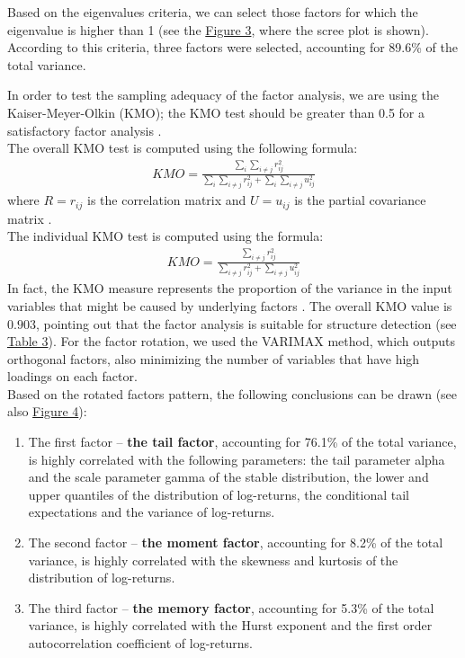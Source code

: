 Based on the eigenvalues criteria, we can select those factors for which the eigenvalue is higher than 1 (see the \hyperref[fig:figure_3]{Figure 3}, where the scree plot is shown). According to this criteria, three factors were selected, accounting for 89.6\% of the total variance.

In order to test the sampling adequacy of the factor analysis, we are using the Kaiser-Meyer-Olkin (KMO); the KMO test should be greater than 0.5 for a satisfactory factor analysis \citep{Tabachnick.op.2013}.\\
The overall KMO test is computed using the following formula:
\begin{align}
KMO=\frac{\sum_{i}\sum_{i\neq j}r_{ij}^2}{\sum_{i}\sum_{i\neq j}r_{ij}^2+\sum_{i}\sum_{i\neq j}u_{ij}^2}
\end{align}
where $R = r_{ij}$ is the correlation matrix and $U = u_{ij}$ is the partial covariance matrix \citep{Cerny.1977, Kaiser.1974}.\\
The individual KMO test is computed using the formula:
\begin{align}
KMO=\frac{\sum_{i\neq j}r_{ij}^2}{\sum_{i\neq j}r_{ij}^2+\sum_{i\neq j}u_{ij}^2}
\end{align}
In fact, the KMO measure represents the proportion of the variance in the input variables that might be caused by underlying factors \citep{Kaiser.1981}. The overall KMO value is $0.903$, pointing out that the factor analysis is suitable for structure detection (see \hyperref[table:table_3]{Table 3}). For the factor rotation, we used the VARIMAX method, which outputs orthogonal factors, also minimizing the number of variables that have high loadings on each factor.\\
\indent{}Based on the rotated factors pattern, the following conclusions can be drawn (see also \hyperref[fig:figure_4]{Figure 4}):
\begin{enumerate}
	\item The first factor – \textbf{the tail factor}, accounting for 76.1\% of the total variance, is highly correlated with the following parameters: the tail parameter alpha and the scale parameter gamma of the stable distribution, the lower and upper quantiles of the distribution of log-returns, the conditional tail expectations and the variance of log-returns.
	\item The second factor – \textbf{the moment factor}, accounting for 8.2\% of the total variance, is highly correlated with the skewness and kurtosis of the distribution of log-returns.
	\item The third factor – \textbf{the memory factor}, accounting for 5.3\% of the total variance, is highly correlated with the Hurst exponent and the first order autocorrelation coefficient of log-returns.
\end{enumerate}

